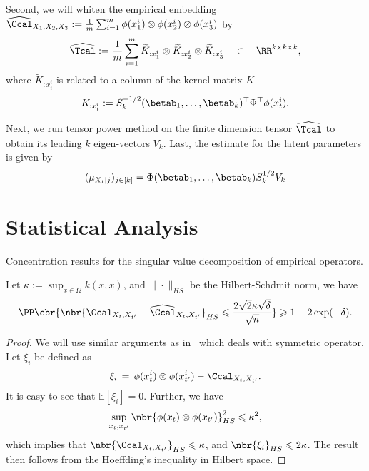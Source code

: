 \documentclass[11pt]{article}
\begin{document}
Second, we will whiten the empirical embedding $\widehat \Ccal_{X_1,X_2,X_3}:=\frac{1}{m}\sum_{i=1}^m \phi(x_1^i) \otimes \phi(x_2^i) \otimes \phi(x_3^i)$ by
\begin{align}
	\widehat \Tcal := \frac{1}{m}\sum_{i=1}^m \widetilde K_{:x_1^i} \otimes \widetilde K_{:x_2^i} \otimes \widetilde K_{:x_3^i} \quad \in \quad \RR^{k\times k \times k},
\end{align}
where $\widetilde K_{:x_t^i}$ is related to a column of the kernel matrix $K$
$$
	K_{:x_t^i} := S_k^{-1/2} (\betab_1,\ldots,\betab_k)^\top \Phi^\top \phi(x_t^i).
$$

Next, we run tensor power method on the finite dimension tensor $\widehat \Tcal$ to obtain its leading $k$ eigen-vectors $V_k$. Last, the estimate for the latent parameters is given by
\begin{align}
	(\mu_{X_t|j})_{j\in[k]} = \Phi (\betab_1,\ldots,\betab_k) S_k^{1/2} V_k
\end{align}

\section{Statistical Analysis}

Concentration results for the singular value decomposition of empirical operators.

\begin{theorem} Let $\kappa:=\sup_{x \in \Omega} k(x,x)$, and $\| \cdot\|_{HS}$ be the Hilbert-Schdmit norm, we have
\begin{eqnarray}
	\PP \cbr{ \nbr{\Ccal_{X_t,X_{t'}} - \widehat \Ccal_{X_t,X_{t'}}}_{HS} \leqslant \frac{2\sqrt{2}\kappa \sqrt{\delta}}{\sqrt{n}} } \geqslant 1-2\exp(-\delta). \label{eq:operator_concentration}
\end{eqnarray}
\end{theorem}

\begin{proof}
We will use similar arguments as in~\cite{RosBelVit2010} which deals with symmetric operator. Let $\xi_{i}$ be defined as
\begin{eqnarray}
\xi_{i}\, =\, \phi(x_t^i) \otimes \phi(x_{t'}^i) - \Ccal_{X_t,X_{t'}}.
\end{eqnarray}
It is easy to see that $\mathbb{E}[\xi_{i}] = 0$. Further, we have
\begin{eqnarray}
	\sup_{x_t,x_{t'}} \nbr{\phi(x_t) \otimes \phi(x_{t'})}^{2}_{HS} \leqslant \kappa^{2},
\end{eqnarray}
which implies that $\nbr{\Ccal_{X_t,X_{t'}}}_{HS} \leqslant \kappa$, and $\nbr{\xi_i}_{HS} \leqslant 2 \kappa$. The result then follows from the Hoeffding's inequality in Hilbert space.
\end{proof}
\end{document}
